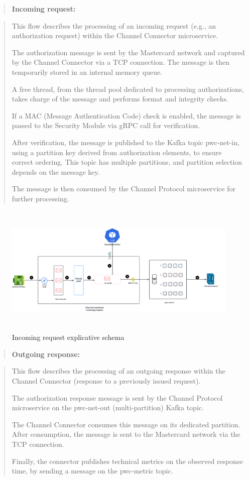 \documentclass[12pt,a4paper]{report}
\begin{document}
\begin{quote}
\textbf{Incoming request:}
\end{quote}
\begin{quote}
This flow describes the processing of an incoming request (e.g., an
authorization request) within the Channel Connector microservice.

The authorization message is sent by the Mastercard network and captured
by the Channel Connector via a TCP connection. The message is then
temporarily stored in an internal memory queue.

A free thread, from the thread pool dedicated to processing
authorizations, takes charge of the message and performs format and
integrity checks.

If a MAC (Message Authentication Code) check is enabled, the message is
passed to the Security Module via gRPC call for verification.

After verification, the message is published to the Kafka topic
pwc-net-in, using a partition key derived from authorization elements,
to ensure correct ordering. This topic has multiple partitions, and
partition selection depends on the message key.

The message is then consumed by the Channel Protocol microservice for
further processing.
\end{quote}

\begin{figure}[H]
\centering
\includegraphics[width=6.22725in,height=2.48059in]{media/image52.png}
\caption{Incoming request explicative schema}
\label{fig:IRES}
\end{figure}

 

\begin{quote}
\textbf{Outgoing response:}
\end{quote}

\begin{quote}
This flow describes the processing of an outgoing response within the
Channel Connector (response to a previously issued request).

The authorization response message is sent by the Channel Protocol
microservice on the pwc-net-out (multi-partition) Kafka topic.

The Channel Connector consumes this message on its dedicated partition.
After consumption, the message is sent to the Mastercard network via the
TCP connection.

Finally, the connector publishes technical metrics on the observed
response time, by sending a message on the pwc-metric topic.
\end{quote}
\end{document}
